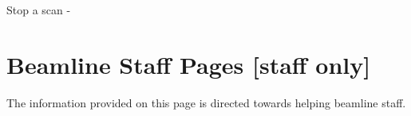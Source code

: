\documentclass[letterpaper,10pt,english]{sphinxmanual}
\begin{document}
Stop a scan - 

\begin{sphinxVerbatim}[commandchars=\\\{\}]
 \PYG{p}{[}\PYG{p}{]}    
 \PYG{p}{[}\PYG{p}{]}   
\end{sphinxVerbatim}


\chapter{Beamline Staff Pages {[}staff only{]}}
\label{\detokenize{staff:beamline-staff-pages-staff-only}}\label{\detokenize{staff::doc}}
The information provided on this page is directed towards helping beamline staff.
\end{document}
